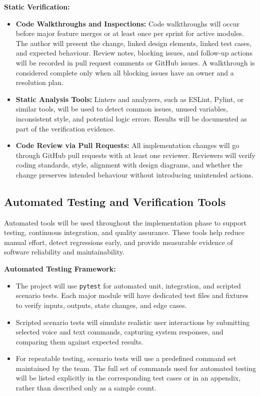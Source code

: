 \documentclass[12pt, titlepage]{article}
\begin{document}
\vspace{0.5em}
\noindent\textbf{Static Verification:}
\begin{itemize}
\item \textbf{Code Walkthroughs and Inspections:}
  Code walkthroughs will occur before major feature merges or at least once
  per sprint for active modules. The author will present the change, linked
  design elements, linked test cases, and expected behaviour. Review notes,
  blocking issues, and follow-up actions will be recorded in pull request
  comments or GitHub issues. A walkthrough is considered complete only when
  all blocking issues have an owner and a resolution plan.

\item \textbf{Static Analysis Tools:}
  Linters and analyzers, such as ESLint, Pylint, or similar tools, will be
  used to detect common issues, unused variables, inconsistent style, and
  potential logic errors. Results will be documented as part of the
  verification evidence.

\item \textbf{Code Review via Pull Requests:}
  All implementation changes will go through GitHub pull requests with at
  least one reviewer. Reviewers will verify coding standards, style,
  alignment with design diagrams, and whether the change preserves intended
  behaviour without introducing unintended actions.
\end{itemize}

\subsection{Automated Testing and Verification Tools}

Automated tools will be used throughout the implementation phase to support
testing, continuous integration, and quality assurance. These tools help
reduce manual effort, detect regressions early, and provide measurable
evidence of software reliability and maintainability.

\vspace{0.5em}
\noindent\textbf{Automated Testing Framework:}
\begin{itemize}
\item The project will use \texttt{pytest} for automated unit,
  integration, and scripted scenario tests. Each major module will have
  dedicated test files and fixtures to verify inputs, outputs, state
  changes, and edge cases.
\item Scripted scenario tests will simulate realistic user interactions by
  submitting selected voice and text commands, capturing system responses,
  and comparing them against expected results.
\item For repeatable testing, scenario tests will use a predefined command
  set maintained by the team. The full set of commands used for automated
  testing will be listed explicitly in the corresponding test cases or in an
  appendix, rather than described only as a sample count.
\end{itemize}
\end{document}

